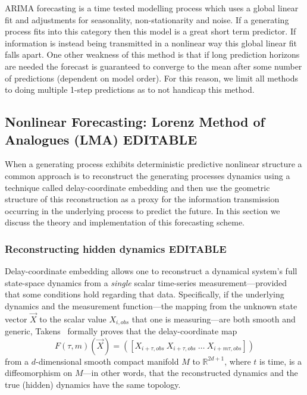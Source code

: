 ARIMA forecasting is a time tested modelling process which uses a global linear fit and adjustments for seasonality, non-stationarity and noise. If a generating process fits into this category then this model is a great short term predictor. If information is instead being transmitted in a nonlinear way this global linear fit falls apart. One other weakness of this method is that if long prediction horizons are needed the forecast is guaranteed to converge to the mean after some number of predictions (dependent on model order). For this reason, we limit all methods to doing multiple 1-step predictions as to not handicap this method. 

\subsection{Nonlinear Forecasting: Lorenz Method of Analogues (LMA){\color{blue} EDITABLE}}\label{sec:lma}

When a generating process exhibits deterministic predictive nonlinear structure a common approach is to reconstruct the generating processes dynamics using a technique called delay-coordinate embedding and then use the geometric structure of this reconstruction as a proxy for the information transmission occurring in the underlying process to predict the future. In this section we discuss the theory and implementation of this forecasting scheme. 


 \subsubsection{Reconstructing hidden dynamics {\color{blue} EDITABLE}}



Delay-coordinate embedding allows one to reconstruct a dynamical system's full
state-space dynamics from a \emph{single} scalar time-series
measurement---provided that some conditions hold regarding that data.
Specifically, if the underlying dynamics and the measurement
function---the mapping from the unknown state vector $\vec{X}$ to the
scalar value $X_{i,obs}$ that one is measuring---are both smooth and generic,
Takens~\cite{takens} formally proves that the delay-coordinate map
\[
F(\tau,m)(\vec{X}) = ([X_{i+\tau,obs} ~ X_{i+\tau,obs} ~ \dots ~X_{i+m\tau,obs}])
\]
from a $d$-dimensional smooth compact manifold $M$ to $\mathbb{R}^{2d+1}$,
where $t$ is time, is a diffeomorphism on $M$---in other words, that
the reconstructed dynamics and the true (hidden) dynamics have the
same topology.

